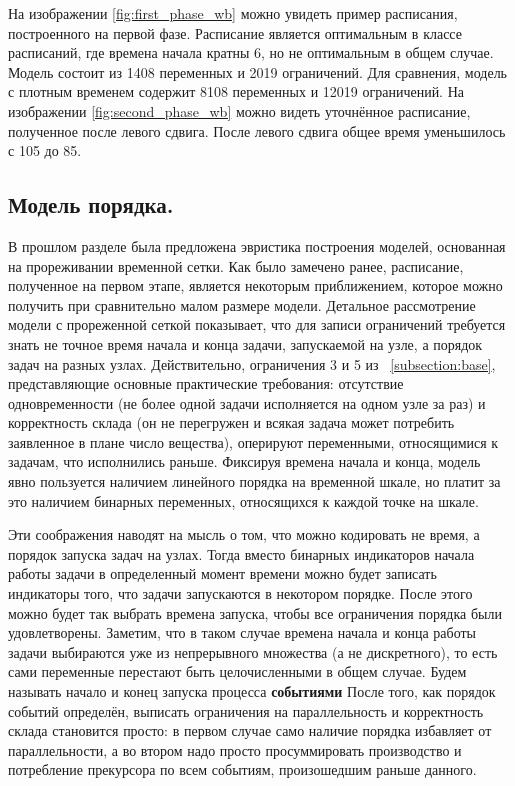 \documentclass[12pt, twoside]{article}
\theoremstyle{definition}
\begin{document}
На изображении \ref{fig:first_phase_wb} можно увидеть пример расписания, построенного на первой фазе. Расписание является оптимальным в классе расписаний, где времена начала кратны 6, но не оптимальным в общем случае. Модель состоит из 1408 переменных и 2019 ограничений. Для сравнения, модель с плотным временем содержит 8108 переменных и 12019 ограничений. На изображении \ref{fig:second_phase_wb} можно видеть уточнённое расписание, полученное после левого сдвига. После левого сдвига общее время уменьшилось с 105 до 85.

\subsection{Модель порядка.}

В прошлом разделе была предложена эвристика построения моделей, основанная на прореживании временной сетки. Как было замечено ранее, расписание, полученное на первом этапе, является некоторым приближением, которое можно получить при сравнительно малом размере модели. Детальное рассмотрение модели с прореженной сеткой показывает, что для записи ограничений требуется знать не точное время начала и конца задачи, запускаемой на узле, а порядок задач на разных узлах. Действительно, ограничения 3 и 5 из ~\ref{subsection:base}, представляющие основные практические требования: отсутствие одновременности (не более одной задачи исполняется на одном узле за раз) и корректность склада (он не перегружен и всякая задача может потребить заявленное в плане число вещества), оперируют переменными, относящимися к задачам, что исполнились раньше. Фиксируя времена начала и конца, модель явно пользуется наличием линейного порядка на временной шкале, но платит за это наличием бинарных переменных, относящихся к каждой точке на шкале.

Эти соображения наводят на мысль о том, что можно кодировать не время, а порядок запуска задач на узлах. Тогда вместо бинарных индикаторов начала работы задачи в определенный момент времени можно будет записать индикаторы того, что задачи запускаются в некотором порядке. После этого можно будет так выбрать времена запуска, чтобы все ограничения порядка были удовлетворены. Заметим, что в таком случае времена начала и конца работы задачи выбираются уже из непрерывного множества (а не дискретного), то есть сами переменные перестают быть целочисленными в общем случае. Будем называть начало и конец запуска процесса \textbf{событиями} После того, как порядок событий определён, выписать ограничения на параллельность и корректность склада становится просто: в первом случае само наличие порядка избавляет от параллельности, а во втором надо просто просуммировать производство и потребление прекурсора по всем событиям, произошедшим раньше данного.
\end{document}
